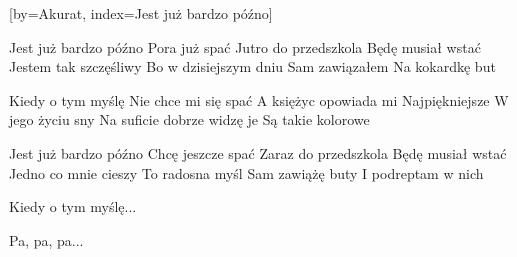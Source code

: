 [by={Akurat},
                     index={Jest już bardzo późno}]
\beginverse

Jest już bardzo późno
Pora już spać
Jutro do przedszkola
Będę musiał wstać
Jestem tak szczęśliwy
Bo w dzisiejszym dniu
Sam zawiązałem
Na kokardkę but

\endverse
\beginverse

Kiedy o tym myślę
Nie chce mi się spać
A księżyc opowiada mi
Najpiękniejsze
W jego życiu sny
Na suficie dobrze widzę je
Są takie kolorowe

\endverse
\beginverse

Jest już bardzo późno
Chcę jeszcze spać
Zaraz do przedszkola
Będę musiał wstać
Jedno co mnie cieszy
To radosna myśl
Sam zawiążę buty
I podreptam w nich

\endverse
\beginverse

Kiedy o tym myślę...

\endverse
\beginverse

Pa, pa, pa...

\endverse
\endsong